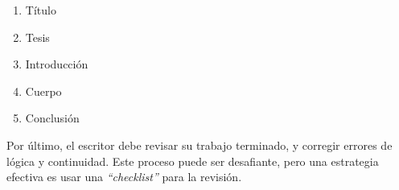 \documentclass[11pt]{article}
\begin{document}
\begin{enumerate}
	\item Título 
	\item Tesis
	\item Introducción
	\item Cuerpo
	\item Conclusión
\end{enumerate}

\medskip

Por último, el escritor debe revisar su trabajo terminado, y corregir errores de lógica y continuidad. Este proceso puede ser desafiante, pero una estrategia efectiva es usar una \textit{``checklist''} para la revisión.



\end{document}
